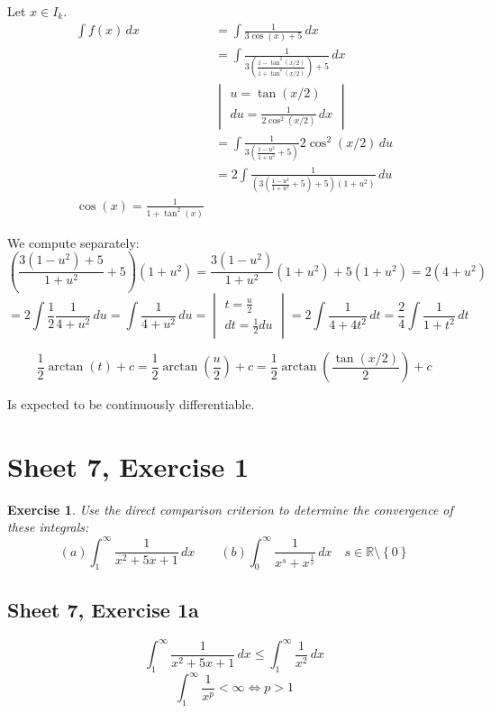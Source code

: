 \documentclass{article}
\newtheorem{ex}{Exercise} %
\newcommand{\set}[1]{\left\{#1\right\}}
\begin{document}
Let $x \in I_k$.
\begin{align*}
  \int f(x) \, dx
    &= \int \frac{1}{3 \cos(x) + 5} \, dx \\
    &= \int \frac{1}{3 \left(\frac{1 - \tan^2(x/2)}{1 + \tan^2(x/2)}\right) + 5} \, dx \\
    &\begin{vmatrix} u = \tan(x/2) \\ du = \frac{1}{2 \cos^2(x/2)} \, dx \end{vmatrix} \\
    &= \int \frac{1}{3 \left(\frac{1 - u^2}{1 + u^2} + 5\right)} 2 \cos^2(x/2) \, du \\
    &= 2 \int \frac{1}{\left(3 \left(\frac{1 - u^2}{1 + u^2} + 5\right) + 5\right)\left(1 + u^2\right)} \, du \\
  \cos(x) = \frac{1}{1 + \tan^2(x)}
\end{align*}

We compute separately:
\[
  \left(\frac{3 (1 - u^2) + 5}{1 + u^2} + 5\right)(1 + u^2) = \frac{3 (1 - u^2)}{1 + u^2} (1 + u^2) + 5(1 + u^2) = 2 (4 + u^2)
\] \[
  = 2 \int \frac12 \frac{1}{4 + u^2} \, du = \int \frac{1}{4 + u^2} \, du = \begin{vmatrix} t = \frac u2 \\ dt = \frac12 du \end{vmatrix}
  = 2 \int \frac{1}{4 + 4 t^2} \, dt = \frac24 \int \frac{1}{1 + t^2} \, dt
\]

\[ \frac12 \arctan(t) + c = \frac12 \arctan\left(\frac u2\right) + c = \frac12 \arctan\left(\frac{\tan(x/2)}{2}\right) + c \]

Is expected to be continuously differentiable.

\section{Sheet 7, Exercise 1}
\begin{ex}
  Use the direct comparison criterion to determine the convergence of these integrals:
  \[ (a) \int_1^{\infty} \frac{1}{x^2 + 5x + 1} \, dx \qquad (b) \int_0^\infty \frac{1}{x^s + x^{\frac1s}} \, dx \quad s \in \mathbb R \setminus \set{0} \]
\end{ex}

\subsection{Sheet 7, Exercise 1a}
\[ \int_1^\infty \frac{1}{x^2 + 5x + 1} \, dx \leq \int_1^\infty \frac{1}{x^2} \, dx \]
\[ \int_1^\infty \frac1{x^p} < \infty \iff p > 1 \]
\end{document}

